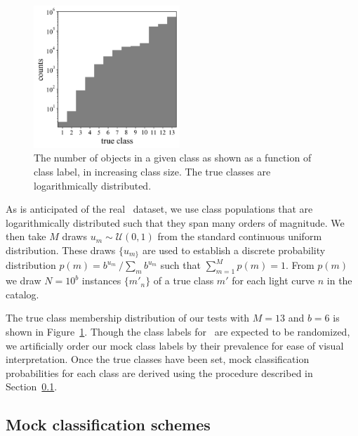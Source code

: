 \begin{figure}
	\begin{center}
    \includegraphics[width=0.49\textwidth]{./fig/complete_counts.png}
		\caption{The number of objects in a given class as shown as a function of class label, in increasing class size.
		The true classes are logarithmically distributed.}
		\label{fig:classdist}
	\end{center}
\end{figure}

As is anticipated of the real \lsst\ dataset, we use class populations that are logarithmically distributed such that they span many orders of magnitude.
We then take $M$ draws $u_{m} \sim \mathcal{U}(0, 1)$ from the standard continuous uniform distribution.
These draws $\{u_{m\}}$ are used to establish a discrete probability distribution $p(m) = b^{u_{m}}\ / \sum_{m} b^{u_{m}}$ such that $\sum_{m=1}^{M} p(m) = 1$.
From $p(m)$ we draw $N = 10^{b}$ instances $\{m'_{n}\}$ of a true class $m'$ for each light curve $n$ in the catalog.

The true class membership distribution of our tests with $M = 13$ and $b = 6$ is shown in Figure~\ref{fig:classdist}.
Though the class labels for \plasticc\ are expected to be randomized, we artificially order our mock class labels by their prevalence for ease of visual interpretation.
Once the true classes have been set, mock classification probabilities for each class are derived using the procedure described in Section~\ref{sec:mockdata}.

\subsection{Mock classification schemes}
\label{sec:mockdata}

